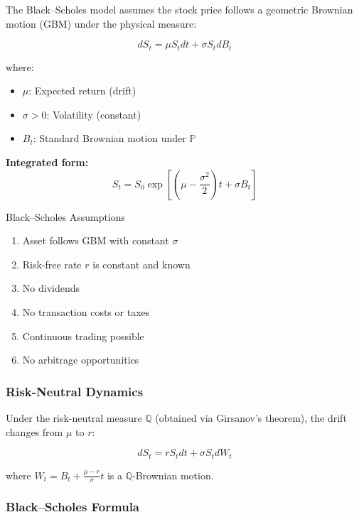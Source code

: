 \documentclass[10pt,twocolumn]{article}
\begin{document}
The Black--Scholes model assumes the stock price follows a geometric Brownian motion (GBM) under the physical measure:

\begin{equation}
dS_t = \mu S_t dt + \sigma S_t dB_t
\end{equation}

where:
\begin{itemize}[itemsep=2pt]
    \item $\mu$: Expected return (drift)
    \item $\sigma > 0$: Volatility (constant)
    \item $B_t$: Standard Brownian motion under $\mathbb{P}$
\end{itemize}

\textbf{Integrated form:}
\begin{equation}
S_t = S_0 \exp\left[\left(\mu - \frac{\sigma^2}{2}\right)t + \sigma B_t\right]
\end{equation}

\begin{keybox}{Black--Scholes Assumptions}
\begin{enumerate}[itemsep=2pt]
    \item Asset follows GBM with constant $\sigma$
    \item Risk-free rate $r$ is constant and known
    \item No dividends
    \item No transaction costs or taxes
    \item Continuous trading possible
    \item No arbitrage opportunities
\end{enumerate}
\end{keybox}

\subsubsection{Risk-Neutral Dynamics}

Under the risk-neutral measure $\mathbb{Q}$ (obtained via Girsanov's theorem), the drift changes from $\mu$ to $r$:

\begin{equation}
dS_t = rS_t dt + \sigma S_t dW_t
\end{equation}

where $W_t = B_t + \frac{\mu - r}{\sigma}t$ is a $\mathbb{Q}$-Brownian motion.


\subsubsection{Black--Scholes Formula}
\end{document}

